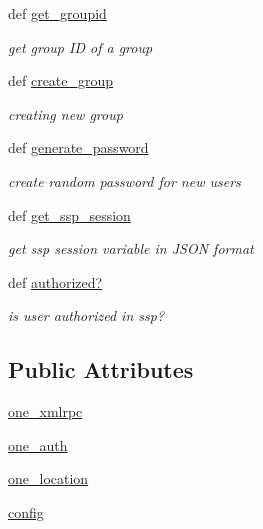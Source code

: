 \begin{DoxyCompactItemize}
\-d\-e\-f \hyperlink{classSSP__Helper_acf8aec3cb3b77cc06caf4c968969a604}{\-g\-e\-t\_\-\-g\-r\-o\-u\-p\-i\-d}
\begin{DoxyCompactList}\small\item\em get group ID of a group \end{DoxyCompactList}\item 
\-d\-e\-f \hyperlink{classSSP__Helper_ad8f0c7e7c6523d22c34a79c51998a7c1}{\-c\-r\-e\-a\-t\-e\_\-\-g\-r\-o\-u\-p}
\begin{DoxyCompactList}\small\item\em creating new group \end{DoxyCompactList}\item 
\-d\-e\-f \hyperlink{classSSP__Helper_aa20a57b52c8940fce3a398ea3cfbcb82}{\-g\-e\-n\-e\-r\-a\-t\-e\_\-\-p\-a\-s\-s\-w\-o\-r\-d}
\begin{DoxyCompactList}\small\item\em create random password for new users \end{DoxyCompactList}\item 
\-d\-e\-f \hyperlink{classSSP__Helper_ada29927d2e44dddae158c49478929059}{\-g\-e\-t\_\-\-s\-s\-p\_\-\-s\-e\-s\-s\-i\-o\-n}
\begin{DoxyCompactList}\small\item\em get ssp session variable in \-J\-S\-O\-N format \end{DoxyCompactList}\item 
\-d\-e\-f \hyperlink{classSSP__Helper_a4d39b23ac2bf42cc38f82e77b1214a7b}{\-a\-u\-t\-h\-o\-r\-i\-z\-e\-d\-?}
\begin{DoxyCompactList}\small\item\em is user authorized in ssp? \end{DoxyCompactList}\end{DoxyCompactItemize}
\subsection*{Public Attributes}
\begin{DoxyCompactItemize}
\item 
\hyperlink{classSSP__Helper_a4fd8d976d2074c90486edf102c4ba8c0}{\-o\-n\-e\_\-\-x\-m\-l\-r\-p\-c}
\item 
\hyperlink{classSSP__Helper_a78aae93c2b5611ab9a6948fa06b389f6}{\-o\-n\-e\_\-\-a\-u\-t\-h}
\item 
\hyperlink{classSSP__Helper_ae10644190226b85b30fecef33fb3b6df}{\-o\-n\-e\_\-\-l\-o\-c\-a\-t\-i\-o\-n}
\item 
\hyperlink{classSSP__Helper_ac2eb114aa8118d494865309bf4dbf84b}{\-c\-o\-n\-f\-i\-g}
\end{DoxyCompactItemize}



